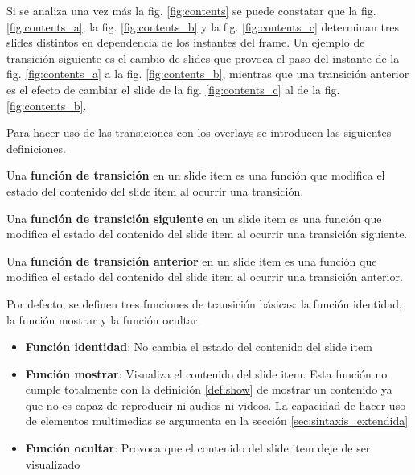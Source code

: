  		Si se analiza una vez más la fig. \ref{fig:contents} se puede constatar que la fig. \ref{fig:contents_a}, la fig. \ref{fig:contents_b} y la fig. \ref{fig:contents_c} determinan tres slides distintos en dependencia de los instantes del frame. Un ejemplo de transición siguiente es el cambio de slides que provoca el paso del instante de la fig. \ref{fig:contents_a} a la fig. \ref{fig:contents_b}, mientras que una transición anterior es el efecto de cambiar el slide de la fig. \ref{fig:contents_c} al de la fig. \ref{fig:contents_b}.


		Para hacer uso de las transiciones con los overlays se introducen las siguientes definiciones.

		\begin{definition}
		\label{def:transition_func}
			Una \textbf{función de transición} en un slide item es una función que modifica el estado del contenido del slide item al ocurrir una transición.
		\end{definition}

		\begin{definition}
		\label{def:next_transition_func}
			Una \textbf{función de transición siguiente} en un slide item es una función que modifica el estado del contenido del slide item al ocurrir una transición siguiente.
		\end{definition}

		\begin{definition}
		\label{def:prev_transition_func}
			Una \textbf{función de transición anterior} en un slide item es una función que modifica el estado del contenido del slide item al ocurrir una transición anterior.
		\end{definition}

		Por defecto, se definen tres funciones de transición básicas: la función identidad, la función mostrar y la función ocultar.
		\begin{itemize}
		\label{it:basic_functions}
			\item \textbf{Función identidad}: No cambia el estado del contenido del slide item
			\item \textbf{Función mostrar}: Visualiza el contenido del slide item. Esta función no cumple totalmente con la definición \ref{def:show} de mostrar un contenido ya que no es capaz de reproducir ni audios ni videos. La capacidad de hacer uso de elementos multimedias se argumenta en la sección \ref{sec:sintaxis_extendida} 
			\item \textbf{Función ocultar}: Provoca que el contenido del slide item deje de ser visualizado
		\end{itemize}

